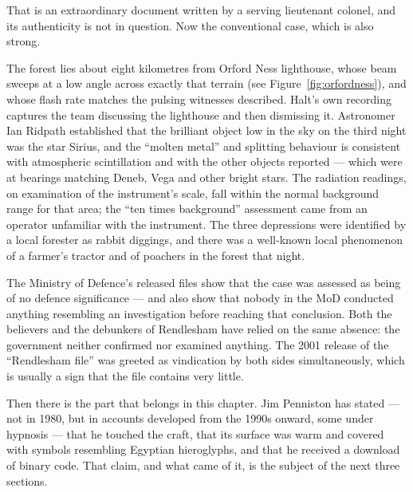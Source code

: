 That is an extraordinary document written by a serving lieutenant colonel, and its
authenticity is not in question. Now the conventional case, which is also strong.

The forest lies about eight kilometres from Orford Ness lighthouse, whose beam sweeps at a low angle across exactly that terrain (see Figure~\ref{fig:orfordness}), and whose flash rate matches the pulsing witnesses
described. Halt's own recording captures the team discussing the lighthouse and then
dismissing it. Astronomer Ian Ridpath established that the brilliant object low in the sky
on the third night was the star Sirius, and the ``molten metal'' and splitting behaviour is
consistent with atmospheric scintillation and with the other objects reported --- which
were at bearings matching Deneb, Vega and other bright stars. The radiation readings, on
examination of the instrument's scale, fall within the normal background range for that
area; the ``ten times background'' assessment came from an operator unfamiliar with the
instrument. The three depressions were identified by a local forester as rabbit diggings,
and there was a well-known local phenomenon of a farmer's tractor and of poachers in the
forest that night.

\begin{funfact}
The Ministry of Defence's released files show that the case was assessed as being of no
defence significance --- and also show that nobody in the MoD conducted anything resembling
an investigation before reaching that conclusion. Both the believers and the debunkers of
Rendlesham have relied on the same absence: the government neither confirmed nor examined
anything. The 2001 release of the ``Rendlesham file'' was greeted as vindication by both
sides simultaneously, which is usually a sign that the file contains very little.
\end{funfact}

Then there is the part that belongs in this chapter. Jim Penniston has stated --- not in
1980, but in accounts developed from the 1990s onward, some under hypnosis --- that he
touched the craft, that its surface was warm and covered with symbols resembling Egyptian
hieroglyphs, and that he received a download of binary code. That claim, and what came of
it, is the subject of the next three sections.

